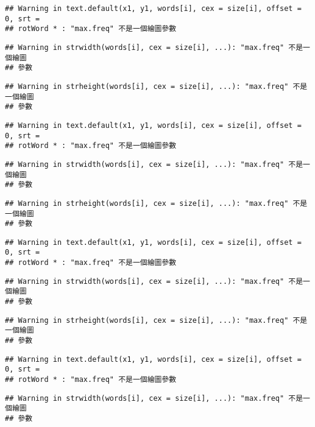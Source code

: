 \documentclass[]{article}
\begin{document}
\begin{verbatim}
## Warning in text.default(x1, y1, words[i], cex = size[i], offset = 0, srt =
## rotWord * : "max.freq" 不是一個繪圖參數
\end{verbatim}

\begin{verbatim}
## Warning in strwidth(words[i], cex = size[i], ...): "max.freq" 不是一個繪圖
## 參數
\end{verbatim}

\begin{verbatim}
## Warning in strheight(words[i], cex = size[i], ...): "max.freq" 不是一個繪圖
## 參數
\end{verbatim}

\begin{verbatim}
## Warning in text.default(x1, y1, words[i], cex = size[i], offset = 0, srt =
## rotWord * : "max.freq" 不是一個繪圖參數
\end{verbatim}

\begin{verbatim}
## Warning in strwidth(words[i], cex = size[i], ...): "max.freq" 不是一個繪圖
## 參數
\end{verbatim}

\begin{verbatim}
## Warning in strheight(words[i], cex = size[i], ...): "max.freq" 不是一個繪圖
## 參數
\end{verbatim}

\begin{verbatim}
## Warning in text.default(x1, y1, words[i], cex = size[i], offset = 0, srt =
## rotWord * : "max.freq" 不是一個繪圖參數
\end{verbatim}

\begin{verbatim}
## Warning in strwidth(words[i], cex = size[i], ...): "max.freq" 不是一個繪圖
## 參數
\end{verbatim}

\begin{verbatim}
## Warning in strheight(words[i], cex = size[i], ...): "max.freq" 不是一個繪圖
## 參數
\end{verbatim}

\begin{verbatim}
## Warning in text.default(x1, y1, words[i], cex = size[i], offset = 0, srt =
## rotWord * : "max.freq" 不是一個繪圖參數
\end{verbatim}

\begin{verbatim}
## Warning in strwidth(words[i], cex = size[i], ...): "max.freq" 不是一個繪圖
## 參數
\end{verbatim}
\end{document}
